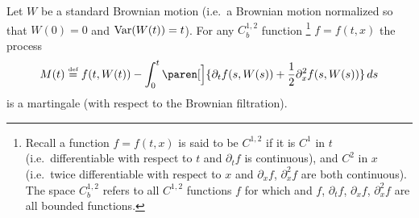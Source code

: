 \begin{theorem}
  Let $W$ be a standard Brownian motion (i.e.\ a Brownian motion normalized so that $W(0) = 0$ and $\operatorname{Var}(W(t)) = t$).
  For any $C^{1,2}_b$ function%
  \footnote{%
    Recall a function $f = f(t, x)$ is said to be $C^{1,2}$ if it is $C^1$ in $t$ (i.e.\ differentiable with respect to $t$ and $\partial_t f$ is continuous), and $C^2$ in $x$ (i.e.\ twice differentiable with respect to $x$ and $\partial_x f$, $\partial_x^2 f$ are both continuous).
    The space $C^{1,2}_b$ refers to all $C^{1,2}$ functions $f$ for which and $f$, $\partial_t f$, $\partial_x f$, $\partial_x^2 f$ are all bounded functions.%
  }
  $f = f(t, x)$ the process
  \begin{equation*}
    M(t) \defeq f(t, W(t))
      - \int_0^t \paren[\Big]{
	  \partial_t f(s, W(s)) + \frac{1}{2} \partial_x^2 f(s, W(s))
	} \, ds
  \end{equation*}
  is a martingale (with respect to the Brownian filtration).
\end{theorem}
